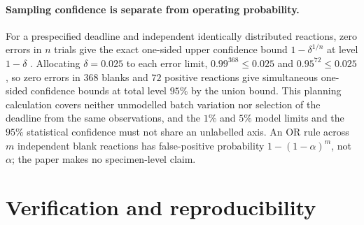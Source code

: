 \documentclass[11pt,a4paper]{article}
\theoremstyle{plain}
\theoremstyle{definition}
\theoremstyle{remark}
\begin{document}
\paragraph{Sampling confidence is separate from operating probability.} For a prespecified deadline and independent identically distributed reactions, zero errors in $n$ trials give the exact one-sided upper confidence bound $1-\delta^{1/n}$ at level $1-\delta$ \citep{clopperpearson1934,hanley1983}. Allocating $\delta=0.025$ to each error limit, $0.99^{368}\le0.025$ and $0.95^{72}\le0.025$, so zero errors in $368$ blanks and $72$ positive reactions give simultaneous one-sided confidence bounds at total level $95\%$ by the union bound. This planning calculation covers neither unmodelled batch variation nor selection of the deadline from the same observations, and the $1\%$ and $5\%$ model limits and the $95\%$ statistical confidence must not share an unlabelled axis. An OR rule across $m$ independent blank reactions has false-positive probability $1-(1-\alpha)^m$, not $\alpha$; the paper makes no specimen-level claim.

\section{Verification and reproducibility}\label{sec:verification}
\end{document}
